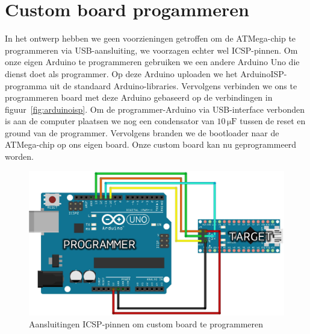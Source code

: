 \section{Custom board progammeren}
In het ontwerp hebben we geen voorzieningen getroffen om de ATMega-chip te programmeren via USB-aansluiting, we voorzagen echter wel ICSP-pinnen. Om onze eigen Arduino te programmeren gebruiken we een andere Arduino Uno die dienst doet als programmer. Op deze Arduino uploaden we het ArduinoISP-programma uit de standaard Arduino-libraries. Vervolgens verbinden we ons te programmeren board met deze Arduino gebaseerd op de verbindingen in figuur~\vref{fig:arduinoisp}. Om de programmer-Arduino via USB-interface verbonden is aan de computer plaatsen we nog een condensator van $10\,\mathrm{\mu F}$ tussen de reset en ground van de programmer. Vervolgens branden we de bootloader naar de ATMega-chip op ons eigen board. Onze custom board kan nu geprogrammeerd worden.

\begin{figure}[H]
	\centering
	\includegraphics[width=\textwidth]{arduinoisp.png}
	\caption{Aansluitingen ICSP-pinnen om custom board te programmeren\label{fig:arduinoisp}}
\end{figure}

